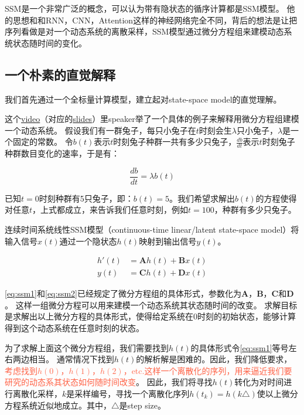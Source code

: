 SSM是一个非常广泛的概念，可以认为带有隐状态的循序计算都是SSM模型。
他的思想和和RNN，CNN，Attention这样的神经网络完全不同，背后的想法是让把序列看做是对一个动态系统的离散采样，SSM模型通过微分方程组来建模动态系统状态随时间的变化。

\subsection{一个朴素的直觉解释}

我们首先通过一个全标量计算模型，建立起对state-space model的直觉理解。

\begin{tcolorbox}[colbacktitle=grey!10!white,colback=yellow!3,title={\textbf{\textcolor{grey}{用微分方程组建模动态系统，一个极简例子}}}]
这个\href{https://www.youtube.com/watch?v=8Q_tqwpTpVU}{video}（对应的\href{https://github.com/hkproj/mamba-notes/tree/main}{slides}）里speaker举了一个具体的例子来解释用微分方程组建模一个动态系统。
假设我们有一群兔子，每只小兔子在$t$时刻会生$\lambda$只小兔子，$\lambda$是一个固定的常数。
令$b(t)$表示$t$时刻兔子种群一共有多少只兔子，$\frac{db}{dt}$表示$t$时刻兔子种群数目变化的速率，于是有：

$$\frac{db}{dt}=\lambda b(t)$$

已知$t=0$时刻种群有5只兔子，即：$b(t)=5$。我们希望求解出$b(t)$的方程使得对任意$t$，上式都成立，来告诉我们任意时刻，例如$t=100$，种群有多少只兔子。
\end{tcolorbox}

连续时间系统线性SSM模型（continuous-time linear/latent state-space model）将输入信号$x(t)$通过一个隐状态$h(t)$映射到输出信号$y(t)$。

\begin{align}
    h'(t) &= \mathbf{A}h(t) + \mathbf{B}x(t) \label{eq:ssm1}\\
    y(t) &=\mathbf{C}h(t) + \mathbf{D}x(t) \label{eq:ssm2}
\end{align}

\eqref{eq:ssm1}和\eqref{eq:ssm2}已经规定了微分方程组的具体形式，参数化为$\mathbf{A}$，$\mathbf{B}$，$\mathbf{C}$和$\mathbf{D}$。
这样一组微分方程可以用来建模一个动态系统其状态随时间的改变。
求解目标是求解出以上微分方程的具体形式，使得给定系统在0时刻的初始状态，能够计算得到这个动态系统在任意时刻的状态。

为了求解上面这个微分方程组，我们需要找到$h(t)$的具体形式令\eqref{eq:ssm1}等号左右两边相当。
通常情况下找到$h(t)$的解析解是困难的。因此，我们降低要求，\textcolor{tomato}{考虑找到$h(0)$，$h(1)$，$h(2)$，etc.这样一个离散化的序列，用来逼近我们要研究的动态系其状态如何随时间改变}。
因此，我们将寻找$h(t)$转化为对时间进行离散化采样，$k$是采样编号，寻找一个离散化序列$h(t_k) = h(k \triangle)$使以上微分方程系统近似地成立。其中，$\triangle$是step size。

